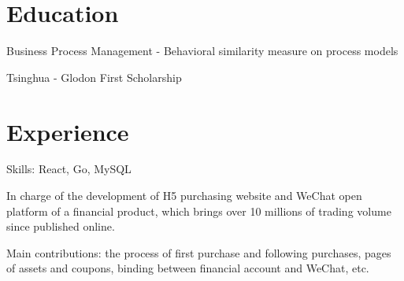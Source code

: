 \documentclass[a4paper]{resume-en}
\begin{document}
\begin{minipage}[t]{0.72\textwidth} %


\section{Education}

\vspace{\topsep}
\begin{tightitemize}
\item Business Process Management - Behavioral similarity measure on process models
\item Tsinghua - Glodon First Scholarship
\end{tightitemize}

\sectionspace



\sectionspace


\section{Experience}

\begin{tightitemize}
\item Skills: React, Go, MySQL
\item In charge of the development of H5 purchasing website and WeChat open platform of a financial product, which brings over 10 millions of trading volume since published online.
\item Main contributions: the process of first purchase and following purchases, pages of assets and coupons, binding between financial account and WeChat, etc.
\end{tightitemize}


\end{minipage}
\end{document}
